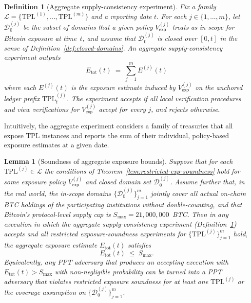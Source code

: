 \documentclass[11pt]{article}
\newtheorem{definition}{Definition}
\newtheorem{lemma}{Lemma}
\begin{document}
\begin{definition}[Aggregate supply-consistency experiment]
\label{def:aggregate-supply}
Fix a family $\mathcal{L} = \{\mathrm{TPL}^{(1)},\dots,\mathrm{TPL}^{(m)}\}$ and a reporting date $t$.
For each $j \in \{1,\dots,m\}$, let $\mathcal{D}_0^{(j)}$ be the subset of domains that a given
policy $V_{\mathsf{exp}}^{(j)}$ treats as in-scope for Bitcoin exposure at time~$t$, and assume that
$\mathcal{D}_0^{(j)}$ is closed over $[0,t]$ in the sense of Definition~\ref{def:closed-domains}.
An \emph{aggregate supply-consistency experiment} outputs
\[
  E_{\mathrm{tot}}(t) \;=\; \sum_{j=1}^{m} E^{(j)}(t)
\]
where each $E^{(j)}(t)$ is the exposure estimate induced by $V_{\mathsf{exp}}^{(j)}$ on the
anchored ledger prefix $\mathrm{TPL}^{(j)}_t$.
The experiment \emph{accepts} if all local verification procedures and view verifications for
$V_{\mathsf{exp}}^{(j)}$ accept for every $j$, and \emph{rejects} otherwise.
\end{definition}

Intuitively, the aggregate experiment considers a family of treasuries that all expose TPL instances and
reports the sum of their individual, policy-based exposure estimates at a given date.

\begin{lemma}[Soundness of aggregate exposure bounds]
\label{lem:aggregate-supply}
Suppose that for each $\mathrm{TPL}^{(j)} \in \mathcal{L}$ the conditions of
Theorem~\ref{lem:restricted-exp-soundness} hold for some exposure policy $V_{\mathsf{exp}}^{(j)}$
and closed domain set $\mathcal{D}_0^{(j)}$.
Assume further that, in the real world, the in-scope domains $\{\mathcal{D}_0^{(j)}\}_{j=1}^m$ jointly
cover all actual on-chain BTC holdings of the participating institutions without double-counting, and
that Bitcoin's protocol-level supply cap is $S_{\max}=21{,}000{,}000$~BTC.
Then in any execution in which the aggregate supply-consistency experiment
(Definition~\ref{def:aggregate-supply}) accepts and all restricted exposure-soundness experiments for
$\{\mathrm{TPL}^{(j)}\}_{j=1}^m$ hold, the aggregate exposure estimate
$E_{\mathrm{tot}}(t)$ satisfies
\[
  E_{\mathrm{tot}}(t) \;\leq\; S_{\max}.
\]
Equivalently, any PPT adversary that produces an accepting execution with
$E_{\mathrm{tot}}(t) > S_{\max}$ with non-negligible probability can be turned into a PPT adversary
that violates restricted exposure soundness for at least one $\mathrm{TPL}^{(j)}$ or the coverage
assumption on $\{\mathcal{D}_0^{(j)}\}_{j=1}^m$.
\end{lemma}
\end{document}
